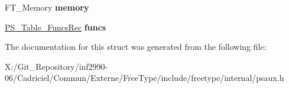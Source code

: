 \begin{DoxyCompactItemize}
\item 
\hypertarget{struct_p_s___table_rec___a061872add9c6d1af67cfdfac5ce2b80d}{F\-T\-\_\-\-Memory {\bfseries memory}}\label{struct_p_s___table_rec___a061872add9c6d1af67cfdfac5ce2b80d}

\item 
\hypertarget{struct_p_s___table_rec___adced5ad36107c90012e9fafa55eab5b9}{\hyperlink{struct_p_s___table___funcs_rec__}{P\-S\-\_\-\-Table\-\_\-\-Funcs\-Rec} {\bfseries funcs}}\label{struct_p_s___table_rec___adced5ad36107c90012e9fafa55eab5b9}

\end{DoxyCompactItemize}


The documentation for this struct was generated from the following file\-:\begin{DoxyCompactItemize}
\item 
X\-:/\-Git\-\_\-\-Repository/inf2990-\/06/\-Cadriciel/\-Commun/\-Externe/\-Free\-Type/include/freetype/internal/psaux.\-h\end{DoxyCompactItemize}

